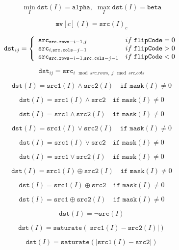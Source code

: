 \documentclass{article}
\begin{document}
\[\min _I \texttt{dst} (I)= \texttt{alpha} , \, \, \max _I \texttt{dst} (I)= \texttt{beta}\]
\pagebreak

\[\texttt{mv} [c](I) = \texttt{src} (I)_c\]
\pagebreak

\[\texttt{dst} _{ij} = \left\{ \begin{array}{l l} \texttt{src} _{\texttt{src.rows}-i-1,j} & if\; \texttt{flipCode} = 0 \\ \texttt{src} _{i, \texttt{src.cols} -j-1} & if\; \texttt{flipCode} > 0 \\ \texttt{src} _{ \texttt{src.rows} -i-1, \texttt{src.cols} -j-1} & if\; \texttt{flipCode} < 0 \\ \end{array} \right.\]
\pagebreak

\[\texttt{dst} _{ij}= \texttt{src} _{i\mod src.rows, \; j\mod src.cols }\]
\pagebreak

\[\texttt{dst} (I) = \texttt{src1} (I) \wedge \texttt{src2} (I) \quad \texttt{if mask} (I) \ne0\]
\pagebreak

\[\texttt{dst} (I) = \texttt{src1} (I) \wedge \texttt{src2} \quad \texttt{if mask} (I) \ne0\]
\pagebreak

\[\texttt{dst} (I) = \texttt{src1} \wedge \texttt{src2} (I) \quad \texttt{if mask} (I) \ne0\]
\pagebreak

\[\texttt{dst} (I) = \texttt{src1} (I) \vee \texttt{src2} (I) \quad \texttt{if mask} (I) \ne0\]
\pagebreak

\[\texttt{dst} (I) = \texttt{src1} (I) \vee \texttt{src2} \quad \texttt{if mask} (I) \ne0\]
\pagebreak

\[\texttt{dst} (I) = \texttt{src1} \vee \texttt{src2} (I) \quad \texttt{if mask} (I) \ne0\]
\pagebreak

\[\texttt{dst} (I) = \texttt{src1} (I) \oplus \texttt{src2} (I) \quad \texttt{if mask} (I) \ne0\]
\pagebreak

\[\texttt{dst} (I) = \texttt{src1} (I) \oplus \texttt{src2} \quad \texttt{if mask} (I) \ne0\]
\pagebreak

\[\texttt{dst} (I) = \texttt{src1} \oplus \texttt{src2} (I) \quad \texttt{if mask} (I) \ne0\]
\pagebreak

\[\texttt{dst} (I) = \neg \texttt{src} (I)\]
\pagebreak

\[\texttt{dst}(I) = \texttt{saturate} (| \texttt{src1}(I) - \texttt{src2}(I)|)\]
\pagebreak

\[\texttt{dst}(I) = \texttt{saturate} (| \texttt{src1}(I) - \texttt{src2} |)\]
\pagebreak
\end{document}
